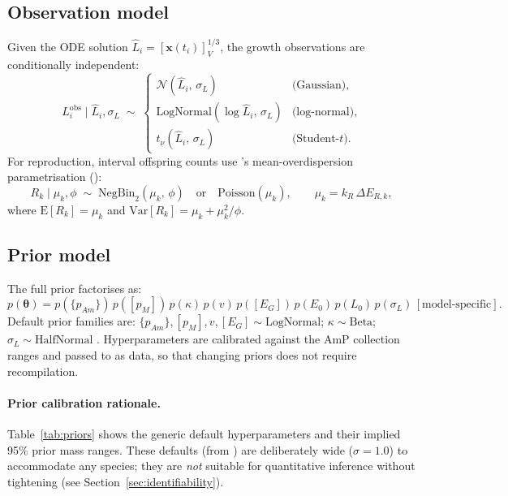 \documentclass[article,shortnames]{jss}
\newcommand{\pAm}{\{p_{Am}\}}
\newcommand{\pM}{[p_M]}
\newcommand{\EG}{[E_G]}
\begin{document}
\subsection{Observation model}

Given the ODE solution $\hat{L}_i = [\mathbf{x}(t_i)]_V^{1/3}$,
the growth observations are conditionally independent:
\begin{equation}
  L_i^{\mathrm{obs}} \mid \hat{L}_i, \sigma_L \;\sim\;
  \begin{cases}
    \mathcal{N}(\hat{L}_i,\, \sigma_L) & \text{(Gaussian)}, \\
    \mathrm{LogNormal}(\log\hat{L}_i,\, \sigma_L) & \text{(log-normal)}, \\
    t_\nu(\hat{L}_i,\, \sigma_L) & \text{(Student-}t\text{)}.
  \end{cases}
  \label{eq:obs_L}
\end{equation}
For reproduction, interval offspring counts use 's
mean-overdispersion parametrisation
():
\begin{equation}
  R_k \mid \mu_k, \phi \;\sim\;
  \mathrm{NegBin}_2(\mu_k,\, \phi)
  \quad\text{or}\quad
  \mathrm{Poisson}(\mu_k),
  \qquad \mu_k = k_R \, \Delta E_{R,k},
  \label{eq:obs_R}
\end{equation}
where $\mathrm{E}[R_k] = \mu_k$ and $\mathrm{Var}[R_k] = \mu_k +
\mu_k^2 / \phi$.

\subsection{Prior model}

The full prior factorises as:
\begin{equation}
  p(\boldsymbol{\theta}) = p(\pAm) \, p(\pM) \, p(\kappa) \, p(v) \,
  p(\EG) \, p(E_0) \, p(L_0) \, p(\sigma_L) \, [\text{model-specific}].
  \label{eq:prior}
\end{equation}
Default prior families are: $\pAm, \pM, v, \EG \sim
\mathrm{LogNormal}$; $\kappa \sim \mathrm{Beta}$; $\sigma_L \sim
\mathrm{HalfNormal}$ \citep[following the recommendations
of][]{GelmanPriorVariance2006}.  Hyperparameters are calibrated
against the AmP collection ranges \citep{MarquesAmP2018} and passed
to  as data, so that changing priors does not require
recompilation.

\paragraph{Prior calibration rationale.}
Table~\ref{tab:priors} shows the generic default hyperparameters
and their implied 95\% prior mass ranges.  These defaults
(from ) are deliberately wide
($\sigma = 1.0$) to accommodate any species; they are
\emph{not} suitable for quantitative inference without
tightening (see Section~\ref{sec:identifiability}).
\end{document}
